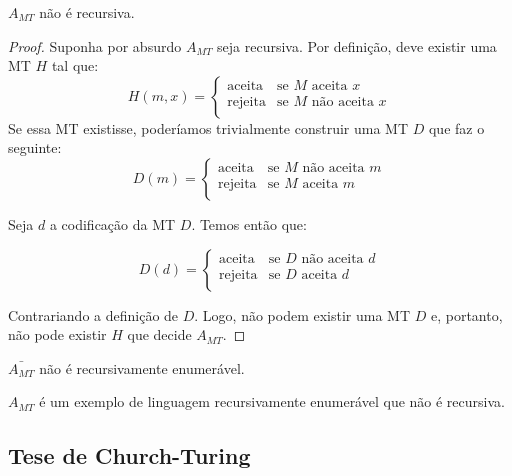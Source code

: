 \begin{theorem}
  $A_{MT}$ não é recursiva.
\end{theorem}
\begin{proof}
  Suponha por absurdo $A_{MT}$ seja recursiva.
  Por definição, deve existir uma MT $H$ tal que:
  \begin{displaymath}
    H(m,x) = \left\{\begin{array}{cl}
                 \textrm{aceita} & \textrm{se $M$ aceita $x$}\\
                 \textrm{rejeita} & \textrm{se $M$ não aceita $x$}\\ 
               \end{array}\right.
  \end{displaymath}
  Se essa MT existisse, poderíamos trivialmente construir uma MT $D$ que faz o seguinte:
  \begin{displaymath}
    D(m) =  \left\{\begin{array}{cl}
                \textrm{aceita} & \textrm{se $M$ não aceita $m$}\\
                \textrm{rejeita} & \textrm{se $M$ aceita $m$}\\ 
              \end{array}\right.
  \end{displaymath}

  Seja $d$ a codificação da MT $D$.
  Temos então que:

  \begin{displaymath}
    D(d) = \left\{\begin{array}{cl}
               \textrm{aceita} & \textrm{se $D$ não aceita $d$}\\
               \textrm{rejeita} & \textrm{se $D$ aceita $d$}\\
             \end{array}\right.
  \end{displaymath}

  Contrariando a definição de $D$.
  Logo, não podem existir uma MT $D$ e, portanto, não pode existir $H$ que decide $A_{MT}$.
\end{proof}

\begin{corollary}
  $\bar{A_{MT}}$ não é recursivamente enumerável.
\end{corollary}

$A_{MT}$ é um exemplo de linguagem recursivamente enumerável que não é recursiva.

\subsection{Tese de Church-Turing}


